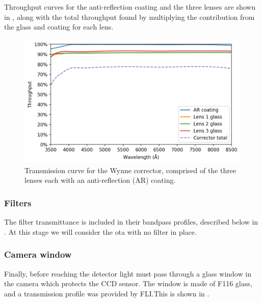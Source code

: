 \begin{colsection}
\begin{colsection}
Throughput curves for the anti-reflection coating and the three lenses are shown in , along with the total throughput found by multiplying the contribution from the glass and coating for each lens.

\newpage

\begin{figure}[t]
    \begin{center}
        \includegraphics[width=\textwidth]{images/throughput/trans_lenses.png}
    \end{center}
    \caption[Wynne corrector transmission curve]{
        Transmission curve for the Wynne corrector, comprised of the three lenses each with an anti-reflection (AR) coating.
    }\label{fig:trans_lenses}
\end{figure}

\subsubsection{Filters}

The filter transmittance is included in their bandpass profiles, described below in . At this stage we will consider the \gls{ota} with no filter in place.

\subsubsection{Camera window}

Finally, before reaching the detector light must pass through a glass window in the camera which protects the CCD sensor. The window is made of F116 glass, and a transmission profile was provided by FLI.\@ This is shown in .

\newpage


\end{colsection}
\end{colsection}

